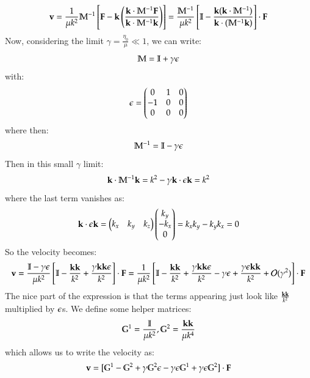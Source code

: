 \begin{equation}
    \mathbf{v} = \frac{1}{\mu k^2}\mathbb{M}^{-1}\left[\mathbf{F} - \mathbf{k}\left(\frac{\mathbf{k} \cdot \mathbb{M}^{-1}\mathbf{F}}{\mathbf{k} \cdot \mathbb{M}^{-1}\mathbf{k}}\right)\right] = \frac{\mathbb{M}^{-1}}{\mu k^2}\left[\mathbb{I} - \frac{\mathbf{k}(\mathbf{k}\cdot \mathbb{M}^{-1})}{\mathbf{k}\cdot(\mathbb{M}^{-1}\mathbf{k})}\right]\cdot\mathbf{F}
\end{equation}
Now, considering the limit $\gamma = \frac{\eta_0}{\mu} \ll 1$, we can write:
\begin{equation}
    \mathbb{M} = \mathbb{I} + \gamma \epsilon
\end{equation}
with:
\begin{equation}
    \epsilon = \begin{pmatrix}0 & 1 & 0 \\ -1 & 0 & 0 \\ 0 & 0 & 0\end{pmatrix}
\end{equation}
where then:
\begin{equation}
    \mathbb{M}^{-1} = \mathbb{I} - \gamma \epsilon
\end{equation}
Then in this small $\gamma$ limit:
\begin{equation}
    \mathbf{k} \cdot \mathbb{M}^{-1}\mathbf{k} = k^2 - \gamma \mathbf{k} \cdot \epsilon \mathbf{k} = k^2
\end{equation}
where the last term vanishes as:
\begin{equation}
    \mathbf{k} \cdot \epsilon \mathbf{k} = \begin{pmatrix}k_x & k_y & k_z\end{pmatrix}\begin{pmatrix}k_y \\ -k_x \\ 0\end{pmatrix} = k_xk_y - k_yk_x = 0
\end{equation}
So the velocity becomes:
\begin{equation}
    \mathbf{v} = \frac{\mathbb{I} - \gamma \epsilon}{\mu k^2}\left[\mathbb{I} - \frac{\mathbf{k}\mathbf{k}}{k^2} + \frac{\gamma \mathbf{k}\mathbf{k}\epsilon}{k^2}\right]\cdot\mathbf{F} = \frac{1}{\mu k^2}\left[\mathbb{I} - \frac{\mathbf{k}\mathbf{k}}{k^2} + \frac{\gamma\mathbf{k}\mathbf{k}\epsilon}{k^2} - \gamma \epsilon + \frac{\gamma \epsilon\mathbf{k}\mathbf{k}}{k^2} + \mathcal{O}(\gamma^2)\right]\cdot\mathbf{F}
\end{equation}
The nice part of the expression is that the terms appearing just look like $\frac{\mathbf{k}\mathbf{k}}{k^2}$ multiplied by $\epsilon$s. We define some helper matrices:
\begin{equation}
    \mathbb{G}^1 = \frac{\mathbb{I}}{\mu k^2}, \mathbb{G}^2 = \frac{\mathbf{k}\mathbf{k}}{\mu k^4}
\end{equation}
which allows us to write the velocity as:
\begin{equation}
    \mathbf{v} = [\mathbb{G}^1 - \mathbb{G}^2 + \gamma \mathbb{G}^2\epsilon - \gamma\epsilon \mathbb{G}^1 + \gamma \epsilon \mathbb{G}^2]\cdot \mathbf{F}
\end{equation}
